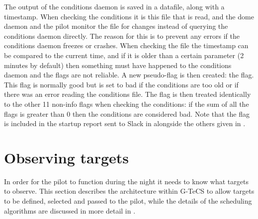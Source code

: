 \begin{colsection}
The output of the conditions daemon is saved in a datafile, along with a timestamp. When checking the conditions it is this file that is read, and the dome daemon and the pilot monitor the file for changes instead of querying the conditions daemon directly. The reason for this is to prevent any errors if the conditions daemon freezes or crashes. When checking the file the timestamp can be compared to the current time, and if it is older than a certain parameter (2 minutes by default) then something must have happened to the conditions daemon and the flags are not reliable. A new pseudo-flag is then created: the  flag. This flag is normally good but is set to bad if the conditions are too old or if there was an error reading the conditions file. The  flag is then treated identically to the other 11 non-info flags when checking the conditions: if the sum of all the flags is greater than 0 then the conditions are considered bad. Note that the  flag is included in the startup report sent to Slack in  alongside the others given in .

\end{colsection}


\section{Observing targets}
\label{sec:observing}


\begin{colsection}

In order for the pilot to function during the night it needs to know what targets to observe. This section describes the architecture within G-TeCS to allow targets to be defined, selected and passed to the pilot, while the details of the scheduling algorithms are discussed in more detail in .

\end{colsection}


